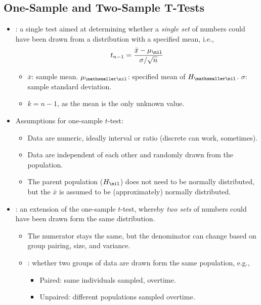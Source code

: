 \begin{itemize}
  \subsection{One-Sample and Two-Sample T-Tests}
  \begin{itemize}
    \item {}: a single test aimed at determining whether a \emph{single set} of numbers could have been drawn from a distribution with a specified mean, i.e.,
    \[%
    t_{n-1} = \frac{\bar{x}-\mu_\nil}{\sigma/\sqrt{n}}
    \]%
      \begin{itemize}
        \item \(\bar{x}\): sample mean. \(\mu_{\mathsmaller\nil}\): specified mean of \(H_{\mathsmaller\nil}\). \(\sigma\): sample standard deviation. 
        \item \(k = n-1\), as the mean is the only unknown value.
      \end{itemize}
    \item Assumptions for one-sample \(t\)-test:
      \begin{itemize}
        \item Data are numeric, ideally interval or ratio (discrete can work, sometimes).
        \item Data are independent of each other and randomly drawn from the population.
        \item The parent population (\(H_\nil\)) does not need to be normally distributed, but the \(\bar{x}\) is assumed to be (approximately) normally distributed.
      \end{itemize}
    \item {}: an extension of the one-sample \(t\)-test, whereby \emph{two sets} of numbers could have been drawn form the same distribution.
    \begin{itemize}
      \item The numerator stays the same, but the denominator can change based on group pairing, size, and variance.
      \item {}: whether two groups of data are drawn form the same population, e.g.,
        \begin{itemize}
          \item Paired: same individuals sampled, overtime.
          \item Unpaired: different populations sampled overtime.
        \end{itemize}

\end{itemize}
\end{itemize}
\end{itemize}
